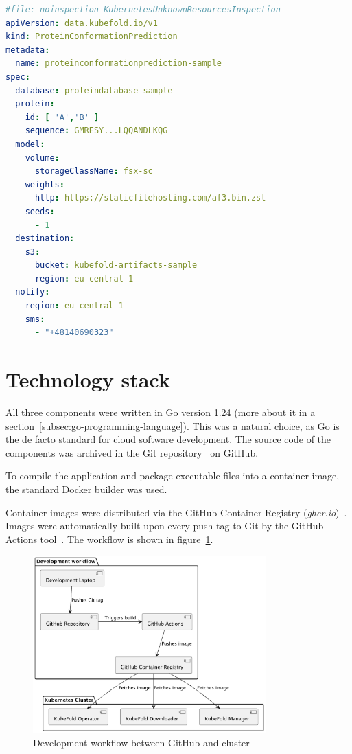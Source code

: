 \begin{lstlisting}[language=yaml,caption={Example \texttt{ProteinConformationPrediction} resource definition},label={lst:protein_conformation_prediction}]
#file: noinspection KubernetesUnknownResourcesInspection
apiVersion: data.kubefold.io/v1
kind: ProteinConformationPrediction
metadata:
  name: proteinconformationprediction-sample
spec:
  database: proteindatabase-sample
  protein:
    id: [ 'A','B' ]
    sequence: GMRESY...LQQANDLKQG
  model:
    volume:
      storageClassName: fsx-sc
    weights:
      http: https://staticfilehosting.com/af3.bin.zst
    seeds:
      - 1
  destination:
    s3:
      bucket: kubefold-artifacts-sample
      region: eu-central-1
  notify:
    region: eu-central-1
    sms:
      - "+48140690323"
\end{lstlisting}


\section{Technology stack}
All three components were written in Go version 1.24 (more about it in a section~\ref{subsec:go-programming-language}).
This was a natural choice, as Go is the de facto standard for cloud software development.
The source code of the components was archived in the Git repository~\cite{git} on GitHub\cite{github}.

To compile the application and package executable files into a container image, the standard Docker builder was used.

Container images were distributed via the GitHub Container Registry (\textit{ghcr.io})~\cite{ghcr}.
Images were automatically built upon every push tag to Git by the GitHub Actions tool~\cite{github_actions}.
The workflow is shown in figure~\ref{fig:docker-images-flow}.

\begin{figure}[htbp]
    \centering
    \includegraphics[width=0.8\textwidth]{images/images}
    \caption{Development workflow between GitHub and cluster}
    \label{fig:docker-images-flow}
\end{figure}

